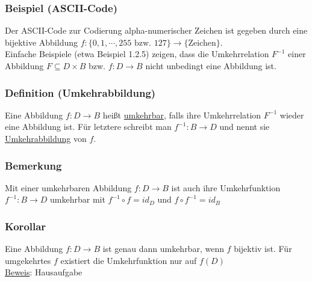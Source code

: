 \subsubsection{Beispiel (ASCII-Code)}
Der ASCII-Code zur Codierung alpha-numerischer Zeichen ist gegeben durch eine bijektive Abbildung $f:\{0,1,\cdots ,255\text{ bzw. $127$}\}\rightarrow \{$Zeichen$\}$.\\
Einfache Beispiele (etwa Beispiel 1.2.5) zeigen, dass die Umkehrrelation $F^{-1}$ einer Abbildung $F\subseteq D\times B$ bzw. $f:D\rightarrow B$ nicht unbedingt eine Abbildung ist.
\subsubsection{Definition (Umkehrabbildung)}
Eine Abbildung $f:D\rightarrow B$ heißt \underline{umkehrbar}, falls ihre Umkehrrelation $F^{-1}$ wieder eine Abbildung ist.  F\"{u}r letztere schreibt man $f^{-1}:B\rightarrow D$ und nennt sie \underline{Umkehrabbildung} von $f$.
\subsubsection{Bemerkung}
Mit einer umkehrbaren Abbildung $f:D\rightarrow B$ ist auch ihre Umkehrfunktion $f^{-1}:B\rightarrow D$ umkehrbar mit $f^{-1}\circ f = id_D$ und $f\circ f^{-1}=id_B$
\subsubsection{Korollar}
Eine Abbildung $f:D\rightarrow B$ ist genau dann umkehrbar, wenn $f$ bijektiv ist.  F\"{u}r umgekehrtes $f$ existiert die Umkehrfunktion nur auf $f(D)$ \\
\underline{Beweis}: Hausaufgabe
